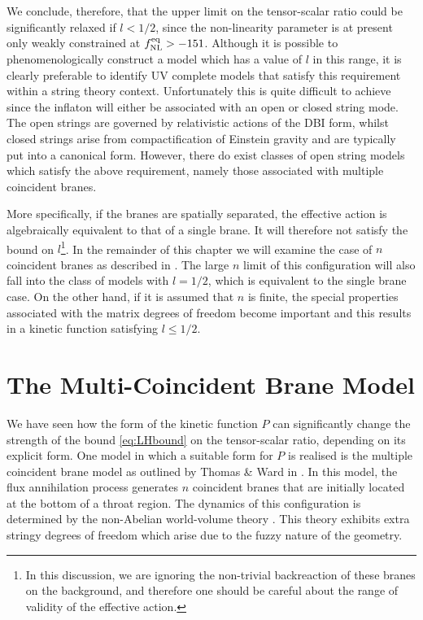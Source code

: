 We conclude, therefore, that 
the upper limit on the tensor-scalar ratio could be significantly 
relaxed if $l <1/2$, since the non-linearity parameter is at present only 
weakly constrained at $f_{\mathrm{NL}}^{\mathrm{eq}} >-151$. Although it is possible 
to phenomenologically construct a model which has a value of $l$ in this 
range, it is clearly preferable to identify  UV complete models
that satisfy this requirement within a string theory context. 
Unfortunately this is quite difficult to achieve since the inflaton 
will either be associated with an open or closed string mode. 
The open strings are governed by relativistic actions of the 
DBI form, whilst closed strings arise from compactification of Einstein gravity
and are typically put into a canonical form.
However, there do exist classes of open string
models which satisfy the above requirement, 
namely those associated with multiple coincident branes.


More specifically, if the branes are
spatially separated, the effective action is algebraically equivalent 
to that of a single brane. It will therefore not satisfy the 
bound on $l$\footnote{In this discussion, we are ignoring 
the non-trivial backreaction of these branes on the background, and therefore 
one should be careful about the range of validity of the effective action.}. 
In the remainder of this chapter we will examine the case of $n$ coincident
branes as described in . The large $n$ limit of this configuration will also
fall into the class of models with $l=1/2$, which is equivalent to the single
brane case. On the other hand, if it is assumed that 
$n$ is finite, the special properties associated with the 
matrix degrees of freedom become important and this 
results in a kinetic function satisfying $l \le 1/2$.



% 
% 
% 
\section{The Multi-Coincident Brane Model} 
\label{sec:multibranes-multi}


We have seen how the form of the kinetic function
$P$ can significantly change the
strength of the bound \eqref{eq:LHbound} on the tensor-scalar ratio, depending
on its explicit
form. One model in which a suitable form for 
$P$ is realised is the multiple coincident
brane model as outlined by Thomas \& Ward in .
In this model, the flux annihilation process 
generates $n$ coincident branes that are initially located at the 
bottom of a throat region. The dynamics of this configuration
is determined by the non-Abelian world-volume theory \cite{myers1,myers2}. 
This theory exhibits extra stringy degrees of freedom which arise due to the 
fuzzy nature of the geometry.

